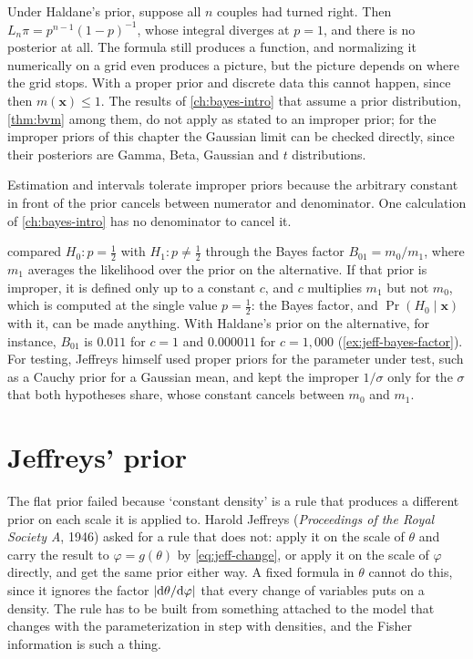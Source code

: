 \begin{pitfall}
Under Haldane's prior, suppose all $n$ couples had turned right.
Then $L_n\pi = p^{n-1}(1-p)^{-1}$, whose integral diverges at $p = 1$, and there is no posterior at all.
The formula still produces a function, and normalizing it numerically on a grid even produces a picture, but the picture depends on where the grid stops.
With a proper prior and discrete data this cannot happen, since then $m(\mathbf{x}) \leq 1$.
The results of \cref{ch:bayes-intro} that assume a prior distribution, \cref{thm:bvm} among them, do not apply as stated to an improper prior; for the improper priors of this chapter the Gaussian limit can be checked directly, since their posteriors are Gamma, Beta, Gaussian and $t$ distributions.
\end{pitfall}

Estimation and intervals tolerate improper priors because the arbitrary constant in front of the prior cancels between numerator and denominator.
One calculation of \cref{ch:bayes-intro} has no denominator to cancel it.

\begin{pitfall}
 compared $H_0: p = \frac12$ with $H_1: p \neq \frac12$ through the Bayes factor $B_{01} = m_0/m_1$, where $m_1$ averages the likelihood over the prior on the alternative.
If that prior is improper, it is defined only up to a constant $c$, and $c$ multiplies $m_1$ but not $m_0$, which is computed at the single value $p = \frac12$: the Bayes factor, and $\Pr(H_0 \mid \mathbf{x})$ with it, can be made anything.
With Haldane's prior on the alternative, for instance, $B_{01}$ is $0.011$ for $c = 1$ and $0.000011$ for $c = 1{,}000$ (\cref{ex:jeff-bayes-factor}).
For testing, Jeffreys himself used proper priors for the parameter under test, such as a Cauchy prior for a Gaussian mean, and kept the improper $1/\sigma$ only for the $\sigma$ that both hypotheses share, whose constant cancels between $m_0$ and $m_1$.
\end{pitfall}

\section{Jeffreys' prior}
\label{sec:jeff-prior}

The flat prior failed because `constant density' is a rule that produces a different prior on each scale it is applied to.
Harold Jeffreys (\textit{Proceedings of the Royal Society A}, 1946) asked for a rule that does not: apply it on the scale of $\theta$ and carry the result to $\varphi = g(\theta)$ by \cref{eq:jeff-change}, or apply it on the scale of $\varphi$ directly, and get the same prior either way.
A fixed formula in $\theta$ cannot do this, since it ignores the factor $\lvert\mathrm{d}\theta/\mathrm{d}\varphi\rvert$ that every change of variables puts on a density.
The rule has to be built from something attached to the model that changes with the parameterization in step with densities, and the Fisher information is such a thing.

